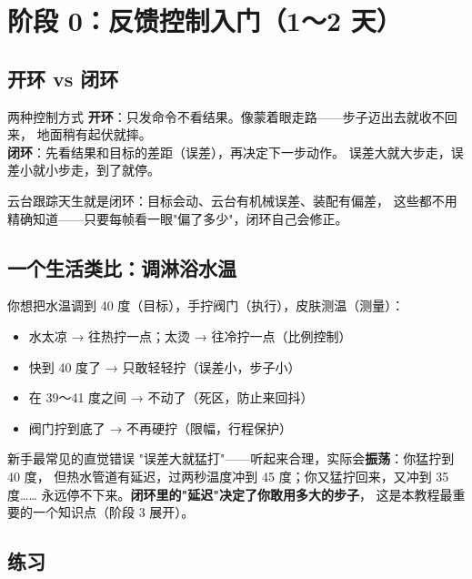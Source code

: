 \documentclass[11pt]{ctexart}
\begin{document}
\section{阶段 0：反馈控制入门（1～2 天）}

\subsection{开环 vs 闭环}

\begin{keybox}{两种控制方式}
\textbf{开环}：只发命令不看结果。像蒙着眼走路——步子迈出去就收不回来，
地面稍有起伏就摔。\\
\textbf{闭环}：先看结果和目标的差距（误差），再决定下一步动作。
误差大就大步走，误差小就小步走，到了就停。
\end{keybox}

云台跟踪天生就是闭环：目标会动、云台有机械误差、装配有偏差，
这些都不用精确知道——只要每帧看一眼"偏了多少"，闭环自己会修正。

\subsection{一个生活类比：调淋浴水温}

你想把水温调到 40 度（目标），手拧阀门（执行），皮肤测温（测量）：

\begin{itemize}
  \item 水太凉 → 往热拧一点；太烫 → 往冷拧一点（比例控制）
  \item 快到 40 度了 → 只敢轻轻拧（误差小，步子小）
  \item 在 39～41 度之间 → 不动了（死区，防止来回抖）
  \item 阀门拧到底了 → 不再硬拧（限幅，行程保护）
\end{itemize}

\begin{warnbox}{新手最常见的直觉错误}
"误差大就猛打"——听起来合理，实际会\textbf{振荡}：你猛拧到 40 度，
但热水管道有延迟，过两秒温度冲到 45 度；你又猛拧回来，又冲到 35 度……
永远停不下来。\textbf{闭环里的"延迟"决定了你敢用多大的步子}，
这是本教程最重要的一个知识点（阶段 3 展开）。
\end{warnbox}

\subsection{练习}
\end{document}
